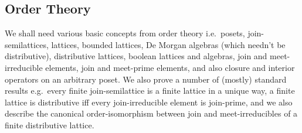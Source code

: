 \documentclass{article}
\begin{document}
\subsection{Order Theory}

We shall need various basic concepts from order theory i.e.\ posets, join-semilattices, lattices, bounded lattices, De Morgan algebras (which needn't be distributive), distributive lattices, boolean lattices and algebras, join and meet-irreducible elements,  join and meet-prime elements, and also closure and interior operators on an arbitrary poset. We also prove a number of (mostly) standard results e.g.\ every finite join-semilattice is a finite lattice in a unique way, a finite lattice is distributive iff every join-irreducible element is join-prime, and we also describe the canonical order-isomorphism between join and meet-irreducibles of a finite distributive lattice.

\end{document}
